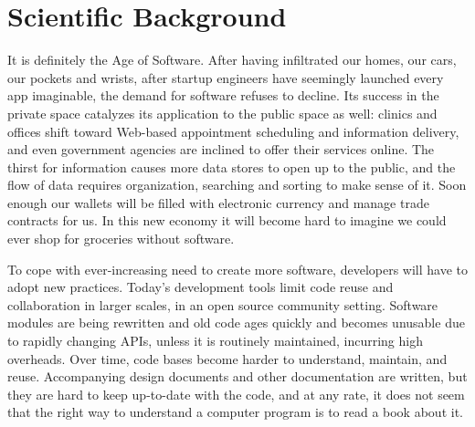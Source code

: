 \section{Scientific Background}

It is definitely the Age of Software.
After having infiltrated our homes, our cars, our pockets and wrists,
after startup engineers have seemingly launched every app imaginable,
the demand for software refuses to decline.
Its success in the private space catalyzes its application to the public
space as well: clinics and offices shift toward Web-based appointment
scheduling and information delivery, and even government agencies are
inclined to offer their services online.
The thirst for information causes more data stores to open up to the
public, and the flow of data requires organization, searching and sorting
to make sense of it.
Soon enough our wallets will be filled with electronic currency and
manage trade contracts for us.
In this new economy it will become hard to imagine we could ever
shop for groceries without software.

To cope with ever-increasing need to create more software, developers
will have to adopt new practices.
Today's development tools limit code reuse and collaboration in larger
scales, \eg in an open source community setting.
Software modules are being rewritten and old code ages quickly and becomes
unusable due to rapidly changing APIs, unless it is routinely maintained,
incurring high overheads.
Over time, code bases become harder to understand, maintain, and reuse.
Accompanying design documents and other documentation are written, but
they are hard to keep up-to-date with the code, and at any rate, it does
not seem that the right way to understand a computer program is to read
a book about it.

